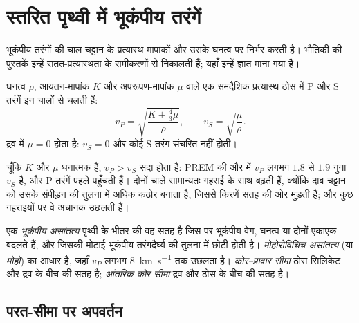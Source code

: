 \section{स्तरित पृथ्वी में भूकंपीय तरंगें}

भूकंपीय तरंगों की चाल चट्टान के प्रत्यास्थ मापांकों और उसके घनत्व पर निर्भर करती है। भौतिकी की पुस्तकें इन्हें सतत-प्रत्यास्थता के समीकरणों से निकालती हैं; यहाँ इन्हें ज्ञात माना गया है।

\begin{proposition}[भूकंपीय चालें]\label{prop:b1:layered-earth:speeds}
घनत्व $\rho$, आयतन-मापांक $K$ और अपरूपण-मापांक $\mu$ वाले एक समदैशिक प्रत्यास्थ ठोस में P और S तरंगें इन चालों से चलती हैं:
\[
  v_P = \sqrt{\frac{K + \tfrac43\mu}{\rho}}, \qquad v_S = \sqrt{\frac{\mu}{\rho}}.
\]
द्रव में $\mu = 0$ होता है: $v_S = 0$ और कोई S तरंग संचरित नहीं होती।
\end{proposition}
\admitted

चूँकि $K$ और $\mu$ धनात्मक हैं, $v_P > v_S$ सदा होता है: PREM की  और  में $v_P$ लगभग $1.8$ से $1.9$ गुना $v_S$ है, और P तरंगें पहले पहुँचती हैं। दोनों चालें सामान्यतः गहराई के साथ बढ़ती हैं, क्योंकि दाब चट्टान को उसके संपीड़न की तुलना में अधिक कठोर बनाता है, जिससे किरणें सतह की ओर मुड़ती हैं; और कुछ गहराइयों पर वे अचानक उछलती हैं।

\begin{definition}[भूकंपीय असांतत्य, मोहो, कोर–प्रावार और आंतरिक-कोर सीमाएँ]
\label{def:b1:layered-earth:discontinuity}
एक \emph{भूकंपीय असांतत्य} पृथ्वी के भीतर की वह सतह है जिस पर भूकंपीय वेग, घनत्व या दोनों एकाएक बदलते हैं, और जिसकी मोटाई भूकंपीय तरंगदैर्घ्य की तुलना में छोटी होती है। \emph{मोहोरोविचिच असांतत्य} (या \emph{मोहो})  का आधार है, जहाँ $v_P$ लगभग \qty{8}{km.s^{-1}} तक उछलता है। \emph{कोर–प्रावार सीमा} ठोस सिलिकेट  और द्रव  के बीच की सतह है; \emph{आंतरिक-कोर सीमा} द्रव  और ठोस  के बीच की सतह है।
\end{definition}

\subsection{परत-सीमा पर अपवर्तन}

